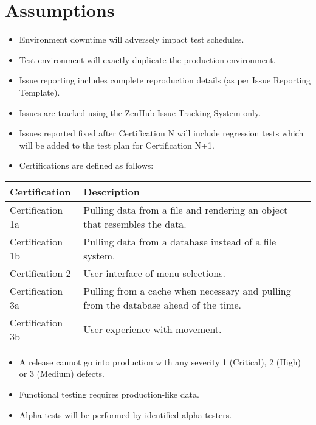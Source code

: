 \documentclass[letterpaper,10pt,english,openany,oneside]{sphinxmanual}
\begin{document}
\section{Assumptions}
\label{\detokenize{test_plan/strategy:assumptions}}
\begin{itemize}
\item {} 
Environment downtime will adversely impact test schedules.

\item {} 
Test environment will exactly duplicate the production environment.

\item {} 
Issue reporting includes complete reproduction details (as per Issue Reporting Template).

\item {} 
Issues are tracked using the ZenHub Issue Tracking System only.

\item {} 
Issues reported fixed after Certification N will include regression tests which will be added to the test plan for Certification N+1.

\end{itemize}

\begin{itemize}
\item {} 
Certifications are defined as follows:

\end{itemize}


\begin{savenotes}\sphinxattablestart
\centering
\begin{tabulary}{\linewidth}[t]{|T|T|}
\hline
\sphinxstyletheadfamily 
Certification
&\sphinxstyletheadfamily 
Description
\\
\hline
Certification 1a
&
Pulling data from a file and rendering an object that resembles the data.
\\
\hline
Certification 1b
&
Pulling data from a database instead of a file system.
\\
\hline
Certification 2
&
User interface of menu selections.
\\
\hline
Certification 3a
&
Pulling from a cache when necessary and pulling from the database ahead of the time.
\\
\hline
Certification 3b
&
User experience with movement.
\\
\hline
\end{tabulary}
\par
\sphinxattableend\end{savenotes}
\begin{itemize}
\item {} 
A release cannot go into production with any severity 1 (Critical), 2 (High) or 3 (Medium) defects.

\item {} 
Functional testing requires production-like data.

\item {} 
Alpha tests will be performed by identified alpha testers.

\end{itemize}
\end{document}
